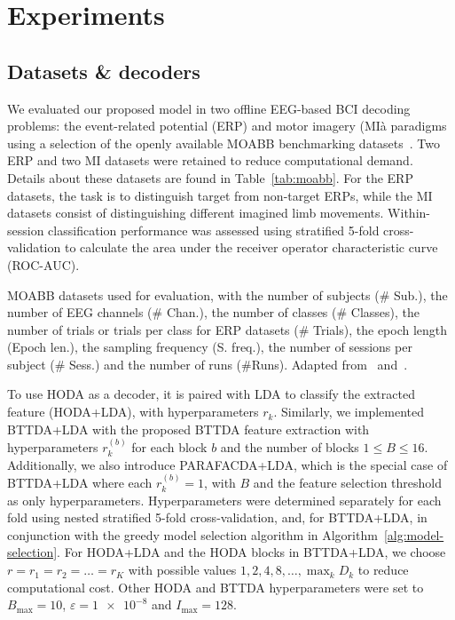 \section{Experiments}
\subsection{Datasets \& decoders}
We evaluated our proposed model in two offline EEG-based BCI decoding problems:
the event-related potential (ERP) and motor imagery (MIà paradigms using a
selection of the openly available MOABB benchmarking datasets~\cite{Aristimunha2023}.
Two ERP and two MI datasets were retained to reduce computational
demand.
Details about these datasets are found in Table~\ref{tab:moabb}.
For the ERP datasets, the task is to distinguish target from non-target ERPs,
while the MI datasets consist of distinguishing different imagined limb
movements.
Within-session classification performance was assessed using stratified 5-fold
cross-validation to calculate the area under the receiver operator
characteristic curve (ROC-AUC).
\begin{table}[t]
	\centering
	\footnotesize
	
  \caption[MOABB datasets used for evaluation.]{MOABB datasets used for evaluation, with the number of
		subjects (\# Sub.), the number of EEG channels (\# Chan.), the number of
    classes (\# Classes), the number of trials or trials per class for ERP
    datasets (\# Trials), the epoch length (Epoch len.), the sampling
		frequency (S. freq.), the number of sessions per subject (\# Sess.) and the
		number of runs (\#Runs).
    Adapted from~\cite{Aristimunha2023}
    and~\cite{Chevallier2024}.}
	\label{tab:moabb}
\end{table}

To use HODA as a decoder, it is paired with LDA to classify the
extracted feature (HODA+LDA), with hyperparameters $r_k$.
Similarly, we implemented BTTDA+LDA with the proposed BTTDA feature
extraction with hyperparameters $r_k^{(b)}$ for each block $b$ and the number of blocks
$1\leq B\leq16$.
Additionally, we also introduce PARAFACDA+LDA, which is the special case of
BTTDA+LDA where each $r_k^{(b)}=1$, with $B$ and the feature selection
threshold as only hyperparameters.
Hyperparameters were determined separately for each fold using nested
stratified 5-fold cross-validation, and, for BTTDA+LDA, in conjunction with the
greedy model selection algorithm in Algorithm~\ref{alg:model-selection}.
For HODA+LDA and the HODA blocks in BTTDA+LDA, we choose
$r=r_1=r_2=\ldots=r_K$ with possible values
$\textstyle{1,2,4,8,\ldots,\max_kD_k}$
to reduce computational cost.
Other HODA and BTTDA hyperparameters were set to
$B_\text{max}=10$, $\varepsilon=\num{1e-8}$ and $I_\text{max}=128$.


